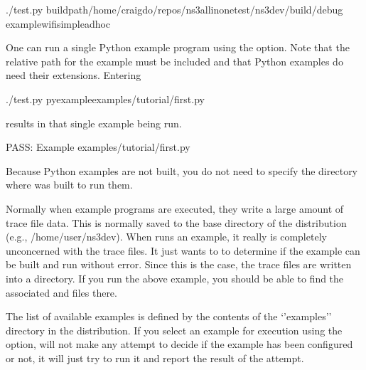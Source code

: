\documentclass[letterpaper,10pt,english]{sphinxmanual}
\renewcommand{\sphinxcode}[1]{\texttt{\small{#1}}}
\begin{document}
\begin{sphinxVerbatim}[commandchars=\\\{\}]
\PYGZdl{} ./test.py \PYGZhy{}\PYGZhy{}buildpath/home/craigdo/repos/ns\PYGZhy{}3\PYGZhy{}allinone\PYGZhy{}test/ns\PYGZhy{}3\PYGZhy{}dev/build/debug \PYGZhy{}\PYGZhy{}examplewifi\PYGZhy{}simple\PYGZhy{}adhoc
\end{sphinxVerbatim}

One can run a single Python example program using the \sphinxcode{\sphinxupquote{\sphinxhyphen{}\sphinxhyphen{}pyexample}}
option.  Note that the relative path for the example must be included
and that Python examples do need their extensions.  Entering

\begin{sphinxVerbatim}[commandchars=\\\{\}]
\PYGZdl{} ./test.py \PYGZhy{}\PYGZhy{}pyexampleexamples/tutorial/first.py
\end{sphinxVerbatim}

results in that single example being run.

\begin{sphinxVerbatim}[commandchars=\\\{\}]
PASS: Example examples/tutorial/first.py
\end{sphinxVerbatim}

Because Python examples are not built, you do not need to specify the
directory where  was built to run them.

Normally when example programs are executed, they write a large amount of trace
file data.  This is normally saved to the base directory of the distribution
(e.g., /home/user/ns\sphinxhyphen{}3\sphinxhyphen{}dev).  When \sphinxcode{} runs an example, it really
is completely unconcerned with the trace files.  It just wants to to determine
if the example can be built and run without error.  Since this is the case, the
trace files are written into a \sphinxcode{} directory.  If you
run the above example, you should be able to find the associated
\sphinxcode{} and \sphinxcode{\sphinxupquote{udp\sphinxhyphen{}echo\sphinxhyphen{}n\sphinxhyphen{}1.pcap}} files there.

The list of available examples is defined by the contents of the ‘’examples’’
directory in the distribution.  If you select an example for execution using
the \sphinxcode{\sphinxupquote{\sphinxhyphen{}\sphinxhyphen{}example}} option, \sphinxcode{} will not make any attempt to decide
if the example has been configured or not, it will just try to run it and
report the result of the attempt.
\end{document}

